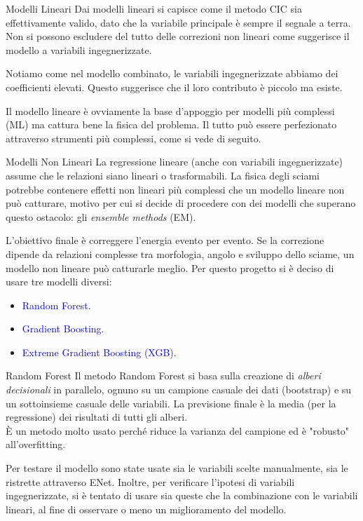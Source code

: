 \documentclass[10pt]{beamer}
\begin{document}
\begin{frame}{Modelli Lineari }
Dai modelli lineari si capisce come il metodo CIC sia effettivamente valido, dato che la variabile principale è sempre il segnale a terra.\\ 
Non si possono escludere del tutto delle correzioni non lineari come suggerisce il modello a variabili ingegnerizzate.
\bigskip

Notiamo come nel modello combinato, le variabili ingegnerizzate abbiamo dei coefficienti elevati. Questo suggerisce che il loro contributo è piccolo ma esiste.
\bigskip

Il modello lineare è ovviamente la base d'appoggio per modelli più complessi (ML) ma cattura bene la fisica del problema. Il tutto può essere perfezionato attraverso strumenti più complessi, come si vede di seguito.
\end{frame}

\begin{frame}{Modelli Non Lineari}
La regressione lineare (anche con variabili ingegnerizzate) assume che le relazioni siano lineari o trasformabili. La fisica degli sciami potrebbe contenere effetti non lineari più complessi che un modello lineare non può catturare, motivo per cui si decide di procedere con dei modelli che superano questo ostacolo: gli \emph{ensemble methods} (EM).
\bigskip

L'obiettivo finale è correggere l'energia evento per evento. Se la correzione dipende da relazioni complesse tra morfologia, angolo e sviluppo dello sciame, un modello non lineare può catturarle meglio. Per questo progetto si è deciso di usare tre modelli diversi:
\begin{itemize}
\item \textcolor{blue}{Random Forest}.
\item \textcolor{blue}{Gradient Boosting}.
\item \textcolor{blue}{Extreme Gradient Boosting (XGB)}.
\end{itemize}
\end{frame}

\begin{frame}{Random Forest}
Il metodo Random Forest si basa sulla creazione di \emph{alberi decisionali} in parallelo, ognuno su un campione casuale dei dati (bootstrap) e su un sottoinsieme casuale delle variabili. La previsione finale è la media (per la regressione) dei risultati di tutti gli alberi.\\
È un metodo molto usato perché riduce la varianza del campione ed è "robusto" all'overfitting. 
\bigskip

Per testare il modello sono state usate sia le variabili scelte manualmente, sia le ristrette attraverso ENet. Inoltre, per verificare l'ipotesi di variabili ingegnerizzate, si è tentato di usare sia queste che la combinazione con le variabili lineari, al fine di osservare o meno un miglioramento del modello.
\end{frame}
\end{document}
